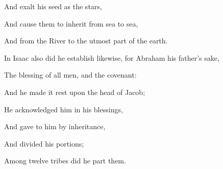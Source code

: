 {\par }{\Q And exalt his seed as the stars,
\par }{\Q And cause them to inherit from sea to sea,
\par }{\Q And from the River to the utmost part of the earth.
\par }{\Q {}In Isaac also did he establish likewise, for Abraham his father’s sake,
\par }{\Q The blessing of all men, and the covenant:
\par }{\Q {}And he made it rest upon the head of Jacob;
\par }{\Q He acknowledged him in his blessings,
\par }{\Q And gave to him by inheritance,
\par }{\Q And divided his portions;
\par }{\Q Among twelve tribes did he part them.
\par }{\BB \par }
